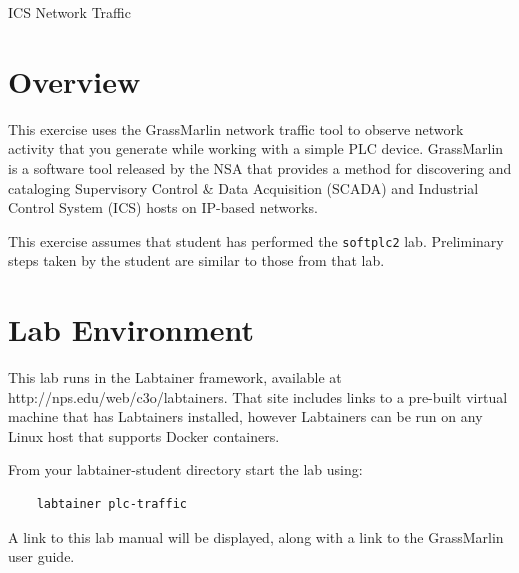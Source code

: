 


\begin{center}
{\LARGE ICS Network Traffic}
\vspace{0.1in}\\
\end{center}


\section{Overview}
This exercise uses the GrassMarlin network traffic tool to
observe network activity that you generate while working
with a simple PLC device.  
GrassMarlin is a software tool released by the NSA that provides a method for discovering and cataloging
Supervisory Control \& Data Acquisition (SCADA) and Industrial Control System (ICS) hosts on IP-based
networks.  

This exercise assumes that student has performed the {\tt softplc2} lab.
Preliminary steps taken by the student are similar to those from that lab.

\section{Lab Environment}
This lab runs in the Labtainer framework,
available at http://nps.edu/web/c3o/labtainers.
That site includes links to a pre-built virtual machine
that has Labtainers installed, however Labtainers can
be run on any Linux host that supports Docker containers.

From your labtainer-student directory start the lab using:
\begin{verbatim}
    labtainer plc-traffic
\end{verbatim}
A link to this lab manual will be displayed, along with a link to the GrassMarlin 
user guide.

